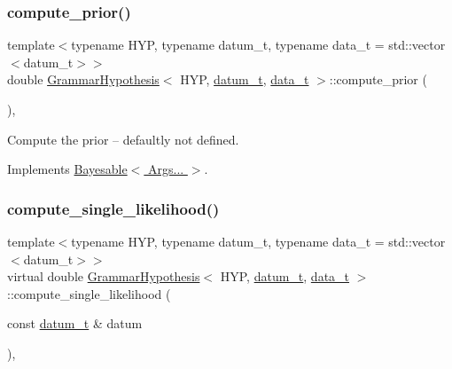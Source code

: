 \mbox{\label{class_grammar_hypothesis_a36c0ec17fb79f56fb4c71ed58f2625f6}} 
\subsubsection{\texorpdfstring{compute\+\_\+prior()}{compute\_prior()}}
{\footnotesize\ttfamily template$<$typename H\+YP, typename datum\+\_\+t, typename data\+\_\+t = std\+::vector$<$datum\+\_\+t$>$$>$ \\
double \hyperlink{class_grammar_hypothesis}{Grammar\+Hypothesis}$<$ H\+YP, \hyperlink{class_bayesable_a9f1a6c0cd7855550fa10b1a8f13a5867}{datum\+\_\+t}, \hyperlink{class_bayesable_aa2788c4d7718c0a824e1d28c4c98f921}{data\+\_\+t} $>$\+::compute\+\_\+prior (\begin{DoxyParamCaption}{ }\end{DoxyParamCaption})\hspace{0.3cm}{\ttfamily [inline]}, {\ttfamily [virtual]}}



Compute the prior -- defaultly not defined. 



Implements \hyperlink{class_bayesable_a1b057a17212ced123545133e2297c01b}{Bayesable$<$ Args... $>$}.

\mbox{\label{class_grammar_hypothesis_ad8e5300800646a0c0af9a0f7d0b86422}} 
\subsubsection{\texorpdfstring{compute\+\_\+single\+\_\+likelihood()}{compute\_single\_likelihood()}}
{\footnotesize\ttfamily template$<$typename H\+YP, typename datum\+\_\+t, typename data\+\_\+t = std\+::vector$<$datum\+\_\+t$>$$>$ \\
virtual double \hyperlink{class_grammar_hypothesis}{Grammar\+Hypothesis}$<$ H\+YP, \hyperlink{class_bayesable_a9f1a6c0cd7855550fa10b1a8f13a5867}{datum\+\_\+t}, \hyperlink{class_bayesable_aa2788c4d7718c0a824e1d28c4c98f921}{data\+\_\+t} $>$\+::compute\+\_\+single\+\_\+likelihood (\begin{DoxyParamCaption}\item[{const \hyperlink{class_bayesable_a9f1a6c0cd7855550fa10b1a8f13a5867}{datum\+\_\+t} \&}]{datum }\end{DoxyParamCaption})\hspace{0.3cm}{\ttfamily [inline]}, {\ttfamily [virtual]}}



